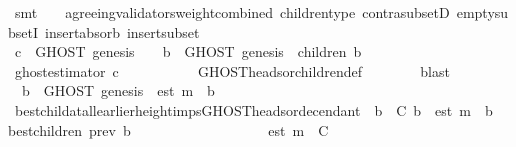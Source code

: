 \begin{isabellebody}
\ {\isacharparenleft}smt\ {\isacartoucheopen}{\isasymsigma}{\isacharprime}\ {\isasymin}\ {\isasymSigma}{\isacartoucheclose}\ agreeing{\isacharunderscore}validators{\isacharunderscore}weight{\isacharunderscore}combined\ children{\isacharunderscore}type\ contra{\isacharunderscore}subsetD\ empty{\isacharunderscore}subsetI\ insert{\isacharunderscore}absorb{}\ insert{\isacharunderscore}subset{\isacharparenright}\ \ \ \ \ \ \isanewline
\ \ \ \ \isamarkupfalse%
\ {\isachardoublequoteopen}c\ {\isasymin}\ GHOST\ {\isacharparenleft}{\isacharbraceleft}genesis{\isacharbraceright}{\isacharcomma}\ {\isasymsigma}{\isacharprime}{\isacharparenright}\ {\isasymunion}\ {\isacharparenleft}{\isasymUnion}\ b\ {\isasymin}\ GHOST\ {\isacharparenleft}{\isacharbraceleft}genesis{\isacharbraceright}{\isacharcomma}\ {\isasymsigma}{\isacharprime}{\isacharparenright}{\isachardot}\ children\ {\isacharparenleft}b{\isacharcomma}\ {\isasymsigma}{\isacharprime}{\isacharparenright}{\isacharparenright}{\isachardoublequoteclose}\ \isanewline
\ \ \ \ \ \ \isamarkupfalse%
\ ghost{\isacharunderscore}estimator\ {\isacartoucheopen}c\ {\isasymin}\ {\isasymepsilon}\ {\isasymsigma}{\isacharprime}{\isacartoucheclose}\isanewline
\ \ \ \ \ \ \isamarkupfalse%
\ GHOST{\isacharunderscore}heads{\isacharunderscore}or{\isacharunderscore}children{\isacharunderscore}def\isanewline
\ \ \ \ \ \ \isamarkupfalse%
\ blast\isanewline
\ \ \ \ \isamarkupfalse%
\ {\isachardoublequoteopen}{\isasymforall}\ b{\isacharprime}{\isacharprime}\ {\isasymin}\ GHOST\ {\isacharparenleft}{\isacharbraceleft}genesis{\isacharbraceright}{\isacharcomma}\ {\isasymsigma}{\isacharprime}{\isacharparenright}{\isachardot}\ est\ m\ {\isasymdownharpoonright}\ b{\isacharprime}{\isacharprime}{\isachardoublequoteclose}\isanewline
\ \ \ \ \ \ \isamarkupfalse%
\ best{\isacharunderscore}child{\isacharunderscore}at{\isacharunderscore}all{\isacharunderscore}earlier{\isacharunderscore}height{\isacharunderscore}imps{\isacharunderscore}GHOST{\isacharunderscore}heads{\isacharunderscore}or{\isacharunderscore}decendant\ {\isacartoucheopen}{\isasymforall}\ b{\isacharprime}\ {\isasymin}\ C{\isachardot}\ b{\isacharprime}\ {\isasymdownharpoonright}\ est\ m\ {\isasymlongrightarrow}\ b{\isacharprime}\ {\isasymin}\ best{\isacharunderscore}children\ {\isacharparenleft}prev\ b{\isacharprime}{\isacharcomma}\ {\isasymsigma}{\isacharprime}{\isacharparenright}{\isacartoucheclose}\isanewline
\ \ \ \ \ \ \ \ \ \ \ \ {\isacartoucheopen}{\isasymsigma}\ {\isasymin}\ {\isasymSigma}{\isacartoucheclose}\ {\isacartoucheopen}{\isasymsigma}{\isacharprime}\ {\isasymin}\ {\isasymSigma}{\isacartoucheclose}\ {\isacartoucheopen}est\ m\ {\isasymin}\ C{\isacartoucheclose}\ \isamarkupfalse%

\end{isabellebody}
